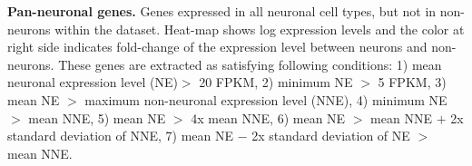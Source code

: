 \textbf{Pan-neuronal genes.} 
Genes expressed in all neuronal cell types, but not in non-neurons within the dataset. Heat-map shows log expression levels and the color at right side indicates fold-change of the expression level between neurons and non-neurons. These genes are extracted as satisfying following conditions: 1) mean neuronal expression level (NE)$>$ 20 FPKM, 2) minimum NE $>$ 5 FPKM, 3) mean NE $>$ maximum non-neuronal expression level (NNE), 4) minimum NE $>$ mean NNE, 5) mean NE $>$ 4x mean NNE, 6) mean NE $>$ mean NNE $+$ 2x standard deviation of NNE, 7) mean NE $-$ 2x standard deviation of NE $>$ mean NNE. 



